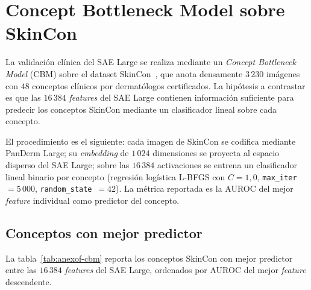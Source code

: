 \section{Concept Bottleneck Model sobre SkinCon}
\label{sec:anexof-cbm}

La validación clínica del SAE Large se realiza mediante un
\emph{Concept Bottleneck Model} (CBM) sobre el dataset
SkinCon~\cite{skincon}, que anota densamente $3\,230$
imágenes con $48$ conceptos clínicos por dermatólogos
certificados. La hipótesis a contrastar es que las
$16\,384$ \emph{features} del SAE Large contienen información
suficiente para predecir los conceptos SkinCon mediante un
clasificador lineal sobre cada concepto.

El procedimiento es el siguiente: cada imagen de SkinCon se codifica
mediante PanDerm Large; su \emph{embedding} de $1\,024$
dimensiones se proyecta al espacio disperso del SAE Large; sobre
las $16\,384$ activaciones se entrena un clasificador lineal
binario por concepto (regresión logística L-BFGS con
$C = 1{,}0$, \texttt{max\_iter}~$= 5\,000$,
\texttt{random\_state}~$=42$). La métrica reportada es la AUROC
del mejor \emph{feature} individual como predictor del concepto.

\subsection{Conceptos con mejor predictor}
\label{sec:anexof-cbm-top}

La tabla~\ref{tab:anexof-cbm} reporta los conceptos SkinCon con
mejor predictor entre las $16\,384$ \emph{features} del SAE
Large, ordenados por AUROC del mejor \emph{feature} descendente.

